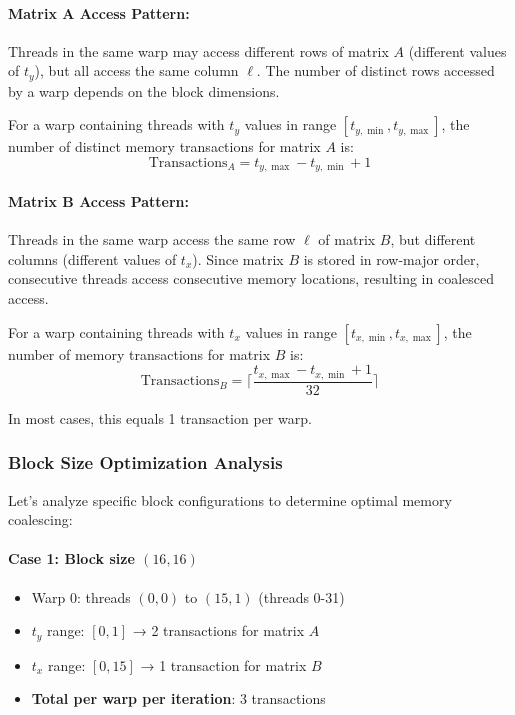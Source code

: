 \documentclass{amsbook}
\theoremstyle{definition}
\begin{document}
\paragraph{Matrix A Access Pattern:}
Threads in the same warp may access different rows of matrix $A$ (different values of $t_y$), but all access the same column $\ell$. The number of distinct rows accessed by a warp depends on the block dimensions.

For a warp containing threads with $t_y$ values in range $[t_{y,\min}, t_{y,\max}]$, the number of distinct memory transactions for matrix $A$ is:
\begin{equation}
\text{Transactions}_A = t_{y,\max} - t_{y,\min} + 1
\end{equation}

\paragraph{Matrix B Access Pattern:}
Threads in the same warp access the same row $\ell$ of matrix $B$, but different columns (different values of $t_x$). Since matrix $B$ is stored in row-major order, consecutive threads access consecutive memory locations, resulting in coalesced access.

For a warp containing threads with $t_x$ values in range $[t_{x,\min}, t_{x,\max}]$, the number of memory transactions for matrix $B$ is:
\begin{equation}
\text{Transactions}_B = \lceil \frac{t_{x,\max} - t_{x,\min} + 1}{32} \rceil
\end{equation}

In most cases, this equals 1 transaction per warp.

\subsubsection{Block Size Optimization Analysis}

Let's analyze specific block configurations to determine optimal memory coalescing:

\paragraph{Case 1: Block size $(16, 16)$}
\begin{itemize}
\item Warp 0: threads $(0,0)$ to $(15,1)$ (threads 0-31)
\item $t_y$ range: $[0, 1]$ → 2 transactions for matrix $A$
\item $t_x$ range: $[0, 15]$ → 1 transaction for matrix $B$
\item \textbf{Total per warp per iteration}: 3 transactions
\end{itemize}
\end{document}
